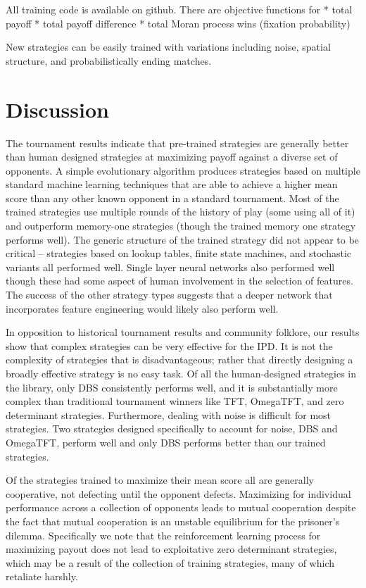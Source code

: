 \documentclass{article}
\begin{document}

All training code is available on github. There are objective functions for
* total payoff
* total payoff difference
* total Moran process wins (fixation probability)

New strategies can be easily trained with variations including noise, spatial
structure, and probabilistically ending matches.

\section{Discussion}

The tournament results indicate that pre-trained strategies are generally better
than human designed strategies at maximizing payoff against a diverse set of
opponents. A simple evolutionary algorithm produces strategies based on multiple
standard machine learning techniques that are able to achieve a higher mean
score than any other known opponent in a standard tournament. Most of the trained
strategies use multiple rounds of the history of play (some using all of it) and
outperform memory-one strategies (though the trained memory one strategy performs
well). The generic structure of the trained strategy did not appear to be
critical -- strategies based on lookup tables, finite state machines, and stochastic
variants all performed well. Single layer neural networks also performed well
though these had some aspect of human involvement in the selection of features.
The success of the other strategy types suggests that a deeper network that
incorporates feature engineering would likely also perform well.

In opposition to historical tournament results and community folklore,
our results show that complex strategies can be very effective for the
IPD. It is not the complexity of strategies that is disadvantageous; rather that directly
designing a broadly effective strategy is no easy task. Of all the human-designed
strategies in the library, only DBS consistently performs well, and it is
substantially more complex than traditional tournament winners like TFT, OmegaTFT,
and zero determinant strategies. Furthermore, dealing with noise is difficult
for most strategies. Two strategies designed specifically to account for noise,
DBS and OmegaTFT, perform well and only DBS performs better than our trained
strategies.

Of the strategies trained to maximize their mean score all are generally
cooperative, not defecting until the opponent defects. Maximizing for individual
performance across a collection of opponents leads to mutual cooperation despite
the fact that mutual cooperation is an unstable equilibrium for the prisoner's
dilemma. Specifically we note that the reinforcement learning process for maximizing
payout does not
lead to exploitative zero determinant strategies, which may be a result of the
collection of training strategies, many of which retaliate harshly.
\end{document}
